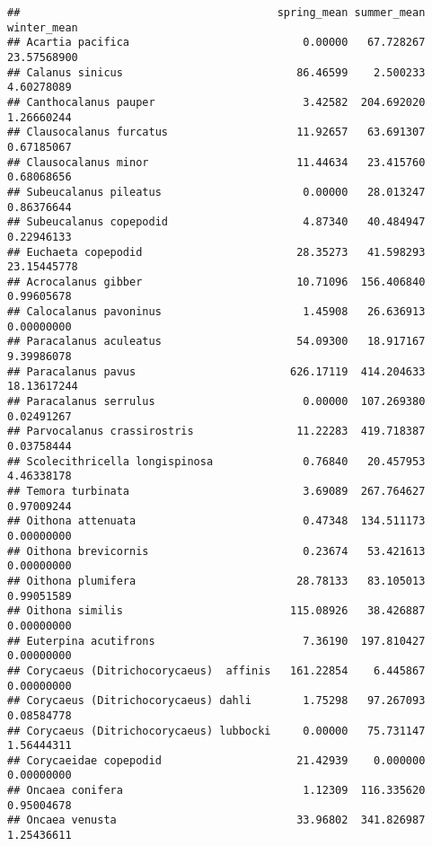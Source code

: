 \documentclass[
]{article}
\begin{document}
\begin{verbatim}
##                                        spring_mean summer_mean winter_mean
## Acartia pacifica                           0.00000   67.728267 23.57568900
## Calanus sinicus                           86.46599    2.500233  4.60278089
## Canthocalanus pauper                       3.42582  204.692020  1.26660244
## Clausocalanus furcatus                    11.92657   63.691307  0.67185067
## Clausocalanus minor                       11.44634   23.415760  0.68068656
## Subeucalanus pileatus                      0.00000   28.013247  0.86376644
## Subeucalanus copepodid                     4.87340   40.484947  0.22946133
## Euchaeta copepodid                        28.35273   41.598293 23.15445778
## Acrocalanus gibber                        10.71096  156.406840  0.99605678
## Calocalanus pavoninus                      1.45908   26.636913  0.00000000
## Paracalanus aculeatus                     54.09300   18.917167  9.39986078
## Paracalanus pavus                        626.17119  414.204633 18.13617244
## Paracalanus serrulus                       0.00000  107.269380  0.02491267
## Parvocalanus crassirostris                11.22283  419.718387  0.03758444
## Scolecithricella longispinosa              0.76840   20.457953  4.46338178
## Temora turbinata                           3.69089  267.764627  0.97009244
## Oithona attenuata                          0.47348  134.511173  0.00000000
## Oithona brevicornis                        0.23674   53.421613  0.00000000
## Oithona plumifera                         28.78133   83.105013  0.99051589
## Oithona similis                          115.08926   38.426887  0.00000000
## Euterpina acutifrons                       7.36190  197.810427  0.00000000
## Corycaeus (Ditrichocorycaeus)  affinis   161.22854    6.445867  0.00000000
## Corycaeus (Ditrichocorycaeus) dahli        1.75298   97.267093  0.08584778
## Corycaeus (Ditrichocorycaeus) lubbocki     0.00000   75.731147  1.56444311
## Corycaeidae copepodid                     21.42939    0.000000  0.00000000
## Oncaea conifera                            1.12309  116.335620  0.95004678
## Oncaea venusta                            33.96802  341.826987  1.25436611
\end{verbatim}
\end{document}
